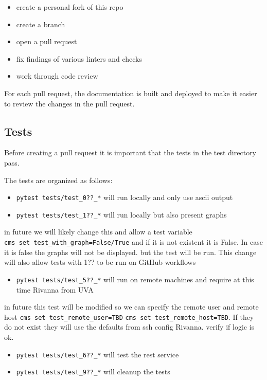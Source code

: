 \begin{itemize}
\item
  create a personal fork of this repo
\item
  create a branch
\item
  open a pull request
\item
  fix findings of various linters and checks
\item
  work through code review
\end{itemize}

For each pull request, the documentation is built and deployed to make
it easier to review the changes in the pull request.

\hypertarget{tests}{%
\subsection{Tests}\label{tests}}

Before creating a pull request it is important that the tests in the
test directory pass.

The tests are organized as follows:

\begin{itemize}
\item
  \texttt{pytest\ tests/test\_0??\_*} will run locally and only use
  ascii output
\item
  \texttt{pytest\ tests/test\_1??\_*} will run locally but also present
  graphs
\end{itemize}

in future we will likely change this and allow a test variable
\texttt{cms\ set\ test\_with\_graph=False/True} and if it is not
existent it is False. In case it is false the graphs will not be
displayed. but the test will be run. This change will also allow tests
with 1?? to be run on GitHub workflows

\begin{itemize}
\item
  \texttt{pytest\ tests/test\_5??\_*} will run on remote machines and
  require at this time Rivanna from UVA
\end{itemize}

in future this test will be modified so we can specify the remote user
and remote host \texttt{cms\ set\ test\_remote\_user=TBD}
\texttt{cms\ set\ test\_remote\_host=TBD}. If they do not exist they
will use the defaults from ssh config Rivanna. verify if logic is ok.

\begin{itemize}
\item
  \texttt{pytest\ tests/test\_6??\_*} will test the rest service
\item
  \texttt{pytest\ tests/test\_9??\_*} will cleanup the tests
\end{itemize}
